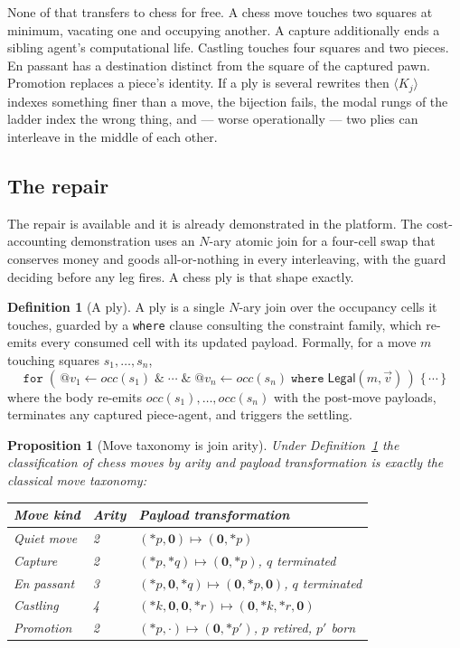 \documentclass[11pt,a4paper]{article}
\makeatletter
\theoremstyle{plain}
\newtheorem{proposition}[theorem]{Proposition}
\theoremstyle{definition}
\newtheorem{definition}[theorem]{Definition}
\theoremstyle{remark}
\newcommand{\Nil}{\mathbf{0}}
\newcommand{\qt}[1]{\ensuremath{@#1}}
\newcommand{\Kmod}[1]{\langle K_{#1}\rangle}
\makeatother
\begin{document}
None of that transfers to chess for free. A chess move touches two squares at
minimum, vacating one and occupying another. A capture additionally ends a
sibling agent's computational life. Castling touches four squares and two
pieces. En passant has a destination distinct from the square of the captured
pawn. Promotion replaces a piece's identity. If a ply is several rewrites then
$\Kmod{j}$ indexes something finer than a move, the bijection fails, the modal
rungs of the ladder index the wrong thing, and --- worse operationally --- two
plies can interleave in the middle of each other.

\subsection{The repair}

The repair is available and it is already demonstrated in the platform. The
cost-accounting demonstration uses an $N$-ary atomic join for a four-cell swap
that conserves money and goods all-or-nothing in every interleaving, with the
guard deciding before any leg fires. A chess ply is that shape exactly.

\begin{definition}[A ply]
\label{def:ply}
A ply is a single $N$-ary join over the occupancy cells it touches, guarded by a
\texttt{where} clause consulting the constraint family, which re-emits every
consumed cell with its updated payload. Formally, for a move $m$ touching
squares $s_1,\dots,s_n$,
\[
  \texttt{for}\;(\,\qt{v_1} \leftarrow \mathit{occ}(s_1)\;\&\;\cdots\;\&\;
  \qt{v_n} \leftarrow \mathit{occ}(s_n)\;\texttt{where}\;
  \mathsf{Legal}(m,\vec v)\,)\;\{\,\cdots\,\}
\]
where the body re-emits $\mathit{occ}(s_1),\dots,\mathit{occ}(s_n)$ with the
post-move payloads, terminates any captured piece-agent, and triggers the
settling.
\end{definition}

\begin{proposition}[Move taxonomy is join arity]
\label{prop:arity}
Under Definition~\ref{def:ply} the classification of chess moves by arity and
payload transformation is exactly the classical move taxonomy:
\begin{center}
\begin{tabular}{@{}lll@{}}
\toprule
Move kind & Arity & Payload transformation \\
\midrule
Quiet move          & 2 & $(*p,\Nil) \mapsto (\Nil,*p)$ \\
Capture             & 2 & $(*p,*q) \mapsto (\Nil,*p)$, $q$ terminated \\
En passant          & 3 & $(*p,\Nil,*q) \mapsto (\Nil,*p,\Nil)$, $q$ terminated \\
Castling            & 4 & $(*k,\Nil,\Nil,*r) \mapsto (\Nil,*k,*r,\Nil)$ \\
Promotion           & 2 & $(*p,\cdot) \mapsto (\Nil,*p')$, $p$ retired, $p'$ born \\
\bottomrule
\end{tabular}
\end{center}
\end{proposition}
\end{document}
